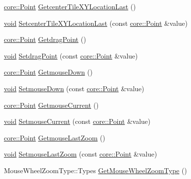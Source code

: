 \begin{DoxyCompactItemize}
\item 
\hyperlink{structcore_1_1_point}{core\-::\-Point} \hyperlink{group___o_p_map_widget_ga616220d474720ed46411357fb48ce323}{\-Getcenter\-Tile\-X\-Y\-Location\-Last} ()
\item 
\hyperlink{group___u_a_v_objects_plugin_ga444cf2ff3f0ecbe028adce838d373f5c}{void} \hyperlink{group___o_p_map_widget_ga3e20d2d38fb1001ab294401f10798932}{\-Setcenter\-Tile\-X\-Y\-Location\-Last} (const \hyperlink{structcore_1_1_point}{core\-::\-Point} \&value)
\item 
\hyperlink{structcore_1_1_point}{core\-::\-Point} \hyperlink{group___o_p_map_widget_ga3e7f3a15092c88e62abd7ae055b83ca9}{\-Getdrag\-Point} ()
\item 
\hyperlink{group___u_a_v_objects_plugin_ga444cf2ff3f0ecbe028adce838d373f5c}{void} \hyperlink{group___o_p_map_widget_ga26fe0b642c132f54f8b89fcca245559d}{\-Setdrag\-Point} (const \hyperlink{structcore_1_1_point}{core\-::\-Point} \&value)
\item 
\hyperlink{structcore_1_1_point}{core\-::\-Point} \hyperlink{group___o_p_map_widget_ga876eaa6494c4f0ca0a57b04aca2b63a7}{\-Getmouse\-Down} ()
\item 
\hyperlink{group___u_a_v_objects_plugin_ga444cf2ff3f0ecbe028adce838d373f5c}{void} \hyperlink{group___o_p_map_widget_ga393d5a89d61e2207a9cf54cd7a7e86db}{\-Setmouse\-Down} (const \hyperlink{structcore_1_1_point}{core\-::\-Point} \&value)
\item 
\hyperlink{structcore_1_1_point}{core\-::\-Point} \hyperlink{group___o_p_map_widget_ga4d84ca5c68011460943e7cb0a2d9ecaa}{\-Getmouse\-Current} ()
\item 
\hyperlink{group___u_a_v_objects_plugin_ga444cf2ff3f0ecbe028adce838d373f5c}{void} \hyperlink{group___o_p_map_widget_ga5e6d344e7c74efe498222b7a343e4a80}{\-Setmouse\-Current} (const \hyperlink{structcore_1_1_point}{core\-::\-Point} \&value)
\item 
\hyperlink{structcore_1_1_point}{core\-::\-Point} \hyperlink{group___o_p_map_widget_gac8e4aec0ad2357d32955a5cd6896d330}{\-Getmouse\-Last\-Zoom} ()
\item 
\hyperlink{group___u_a_v_objects_plugin_ga444cf2ff3f0ecbe028adce838d373f5c}{void} \hyperlink{group___o_p_map_widget_ga04c566589849ca7f9b3357accf403a55}{\-Setmouse\-Last\-Zoom} (const \hyperlink{structcore_1_1_point}{core\-::\-Point} \&value)
\item 
\-Mouse\-Wheel\-Zoom\-Type\-::\-Types \hyperlink{group___o_p_map_widget_gaaf45ca5113dc967072f68d3785b6089b}{\-Get\-Mouse\-Wheel\-Zoom\-Type} ()

\end{DoxyCompactItemize}
